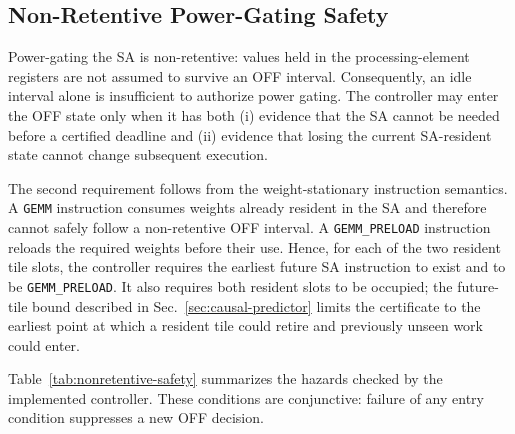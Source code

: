 \subsection{Non-Retentive Power-Gating Safety}
\label{sec:nonretentive-safety}

Power-gating the SA is non-retentive: values held in the processing-element
registers are not assumed to survive an OFF interval.  Consequently, an idle
interval alone is insufficient to authorize power gating.  The controller may
enter the OFF state only when it has both (i) evidence that the SA cannot be
needed before a certified deadline and (ii) evidence that losing the current
SA-resident state cannot change subsequent execution.

The second requirement follows from the weight-stationary instruction
semantics.  A \texttt{GEMM} instruction consumes weights already resident in
the SA and therefore cannot safely follow a non-retentive OFF interval.  A
\texttt{GEMM\_PRELOAD} instruction reloads the required weights before their
use.  Hence, for each of the two resident tile slots, the controller requires
the earliest future SA instruction to exist and to be
\texttt{GEMM\_PRELOAD}.  It also requires both resident slots to be occupied;
the future-tile bound described in Sec.~\ref{sec:causal-predictor}
limits the certificate to the earliest point at which a resident tile could
retire and previously unseen work could enter.

Table~\ref{tab:nonretentive-safety} summarizes the hazards checked by the
implemented controller.  These conditions are conjunctive: failure of any
entry condition suppresses a new OFF decision.

